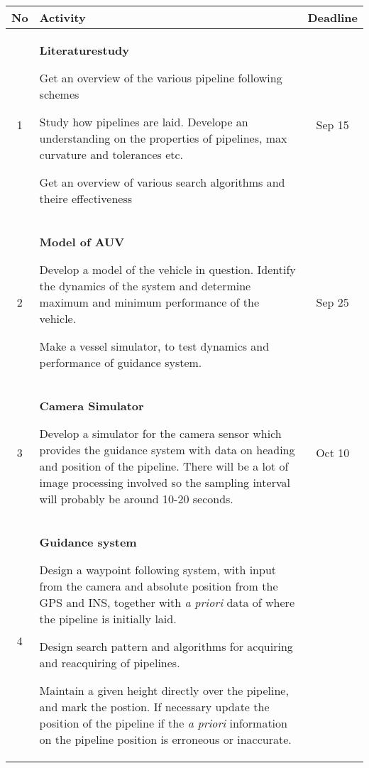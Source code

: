 \documentclass[a4paper,10pt]{article}
\newenvironment{myitemize}
{
    \begin{list}{- \ }{}
        \setlength{\topsep}{0pt}
        \setlength{\parskip}{0pt}
        \setlength{\partopsep}{0pt}
        \setlength{\parsep}{0pt}
        \setlength{\itemsep}{0pt} 
}
{
    \end{list} 
}
\begin{document}
	\begin{tabular}{| c | p{9cm} || c |}
	\hline
	No 	&	Activity	&	Deadline \\
	\hline
	\hline
	1	&	\textbf{Literaturestudy}\begin{myitemize}
	 	 				 \item Get an overview of the various pipeline following schemes
	 	 				 \item Study how pipelines are laid. Develope an understanding on the properties of pipelines, max curvature and tolerances etc.
	 	 				 \item Get an overview of various search algorithms and theire effectiveness
	 	 				\end{myitemize}	
								& 	Sep 15\\
	\hline
	2	&	\textbf{Model of AUV}	\begin{myitemize}
	 	 	            		 \item Develop a model of the vehicle in question. Identify the dynamics of the system and determine maximum and minimum performance of the vehicle. 
						 \item Make a vessel simulator, to test dynamics and performance of guidance system.
	 	 	            		\end{myitemize}
								&	Sep 25\\
	\hline
	3	&	\textbf{Camera Simulator}\begin{myitemize}
	 	 	       			 \item Develop a simulator for the camera sensor which provides the guidance system with data on heading and position of the pipeline. There will be a lot of image processing involved so the sampling interval will probably be around 10-20 seconds.
	 	 	       			\end{myitemize}
								&	Oct 10 \\
	\hline
	4	&	\textbf{Guidance system}\begin{myitemize}
	 	 	               		 \item Design a waypoint following system, with input from the camera and absolute position from the GPS and INS, together with \textit{a priori} data of where the pipeline is initially laid. 
	 	 	               		 \item Design search pattern and algorithms for acquiring and reacquiring of pipelines. 
	 	 	               		 \item Maintain a given height directly over the pipeline, and mark the postion. If necessary update the position of the pipeline if the \textit{a priori} information on the pipeline position is erroneous or inaccurate. 

\end{myitemize}
\end{tabular}
\end{document}
